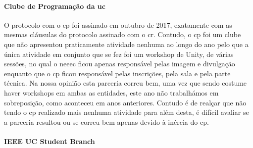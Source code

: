 \paragraph{Clube de Programação da \acrlong{uc}}

O protocolo com o \acrfull{cp} foi assinado em outubro de 2017, exatamente com as mesmas cláusulas do protocolo assinado com o \acrshort{cr}. Contudo, o \acrshort{cp} foi um clube que não apresentou praticamente atividade nenhuma ao longo do ano pelo que a única atividade em conjunto que se fez foi um workshop de Unity, de várias sessões, no qual o \acrshort{neeec} ficou apenas responsável pelas imagem e divulgação enquanto que o \acrshort{cp} ficou responsável pelas inscrições, pela sala e pela parte técnica. Na nossa opinião esta parceria correu bem, uma vez que sendo costume haver workshops em ambas as entidades, este ano não trabalhámos em sobreposição, como aconteceu em anos anteriores. Contudo é de realçar que não tendo o \acrshort{cp} realizado mais nenhuma atividade para além desta, é difícil avaliar se a parceria resultou ou se correu bem apenas devido à inércia do \acrshort{cp}.

\paragraph{IEEE UC Student Branch}

